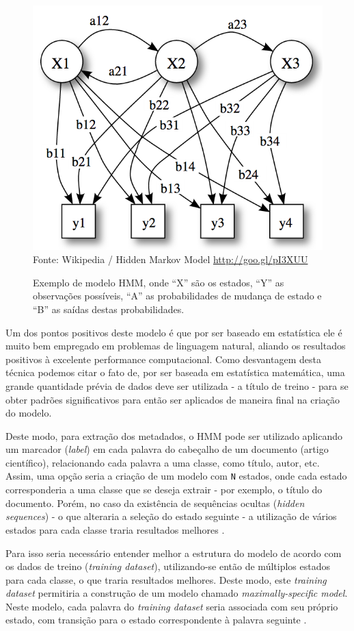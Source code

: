 \begin{figure}
    \centering
    \caption{Exemplo de modelo HMM, onde ``X'' são os estados, ``Y'' as observações possíveis, ``A'' as probabilidades de mudança de estado e ``B'' as saídas destas probabilidades.}
    \label{fig:hmm-states}
    \includegraphics[width=0.7\linewidth]{./assets/images/hmm-states}
    \center\footnotesize{Fonte: Wikipedia / Hidden Markov Model \url{http://goo.gl/pI3XUU}}
\end{figure}

Um dos pontos positivos deste modelo é que por ser baseado em estatística ele é muito bem empregado em problemas de linguagem natural, aliando os resultados positivos à excelente performance computacional. Como desvantagem desta técnica podemos citar o fato de, por ser baseada em estatística matemática, uma grande quantidade prévia de dados deve ser utilizada - a título de treino - para se obter padrões significativos para então ser aplicados de maneira final na criação do modelo.

Deste modo, para extração dos metadados, o HMM pode ser utilizado aplicando um marcador (\textit{label}) em cada palavra do cabeçalho de um documento (artigo científico), relacionando cada palavra a uma classe, como título, autor, etc. Assim, uma opção seria a criação de um modelo com \texttt{N} estados, onde cada estado corresponderia a uma classe que se deseja extrair - por exemplo, o título do documento. Porém, no caso da existência de sequências ocultas (\textit{hidden sequences}) - o que alteraria a seleção do estado seguinte - a utilização de vários estados para cada classe traria resultados melhores \cite{Seymore-HMM-IE}.


Para isso seria necessário entender melhor a estrutura do modelo de acordo com os dados de treino (\textit{training dataset}), utilizando-se então de múltiplos estados para cada classe, o que traria resultados melhores. Deste modo, este \textit{training dataset} permitiria a construção de um modelo chamado \textit{maximally-specific model}. Neste modelo, cada palavra do \textit{training dataset} seria associada com seu próprio estado, com transição para o estado correspondente à palavra seguinte \cite{Seymore-HMM-IE}.

